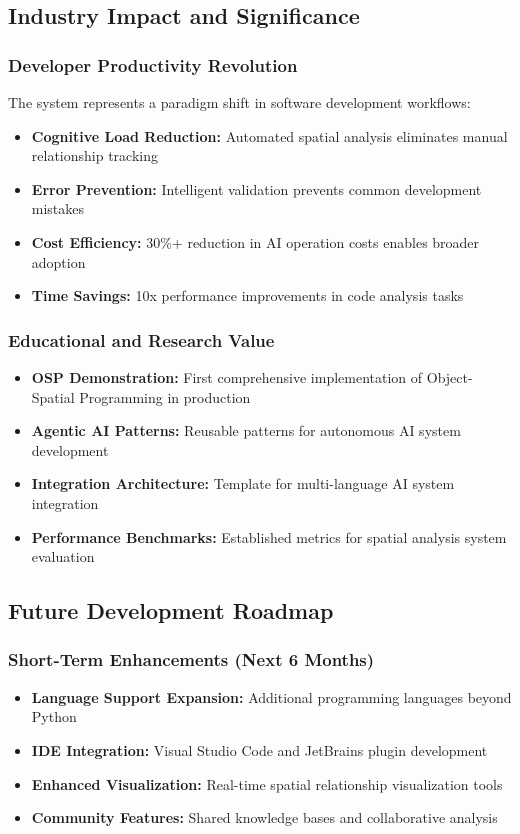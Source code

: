 \documentclass[12pt,a4paper]{article}
\begin{document}
\subsection{Industry Impact and Significance}

\subsubsection{Developer Productivity Revolution}
The system represents a paradigm shift in software development workflows:
\begin{itemize}
    \item \textbf{Cognitive Load Reduction:} Automated spatial analysis eliminates manual relationship tracking
    \item \textbf{Error Prevention:} Intelligent validation prevents common development mistakes
    \item \textbf{Cost Efficiency:} 30\%+ reduction in AI operation costs enables broader adoption
    \item \textbf{Time Savings:} 10x performance improvements in code analysis tasks
\end{itemize}

\subsubsection{Educational and Research Value}
\begin{itemize}
    \item \textbf{OSP Demonstration:} First comprehensive implementation of Object-Spatial Programming in production
    \item \textbf{Agentic AI Patterns:} Reusable patterns for autonomous AI system development
    \item \textbf{Integration Architecture:} Template for multi-language AI system integration
    \item \textbf{Performance Benchmarks:} Established metrics for spatial analysis system evaluation
\end{itemize}

\subsection{Future Development Roadmap}

\subsubsection{Short-Term Enhancements (Next 6 Months)}
\begin{itemize}
    \item \textbf{Language Support Expansion:} Additional programming languages beyond Python
    \item \textbf{IDE Integration:} Visual Studio Code and JetBrains plugin development
    \item \textbf{Enhanced Visualization:} Real-time spatial relationship visualization tools
    \item \textbf{Community Features:} Shared knowledge bases and collaborative analysis
\end{itemize}
\end{document}
